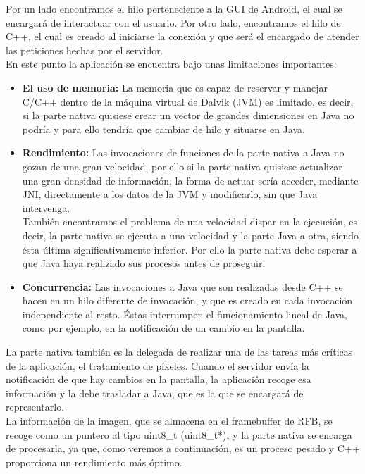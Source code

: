 Por un lado encontramos el hilo perteneciente a la GUI de Android, el cual se encargará de interactuar con el usuario. Por otro lado, encontramos el hilo de C++, el cual es creado al iniciarse la conexión y que será el encargado de atender las peticiones hechas por el servidor.\\

En este punto la aplicación se encuentra bajo unas limitaciones importantes:
\begin{itemize}
\item \textbf{El uso de memoria:} La memoria que es capaz de reservar y manejar C/C++ dentro de la máquina virtual de Dalvik (JVM) es limitado, es decir, si la parte nativa quisiese crear un vector de grandes dimensiones en Java no podría y para ello tendría que cambiar de hilo y situarse en Java.
\item \textbf{Rendimiento:} Las invocaciones de funciones de la parte nativa a Java no gozan de una gran velocidad, por ello si la parte nativa quisiese actualizar una gran densidad de información, la forma de actuar sería acceder, mediante JNI, directamente a los datos de la JVM y modificarlo, sin que Java intervenga.\\

También encontramos el problema de una velocidad dispar en la ejecución, es decir, la parte nativa se ejecuta a una velocidad y la parte Java a otra, siendo ésta última significativamente inferior. Por ello la parte nativa debe esperar a que Java haya realizado sus procesos antes de proseguir.

\item \textbf{Concurrencia:} Las invocaciones a Java que son realizadas desde C++ se hacen en un hilo diferente de invocación, y que es creado en cada invocación independiente al resto. Éstas interrumpen el funcionamiento lineal de Java, como por ejemplo, en la notificación de un cambio en la pantalla.

\end{itemize}

La parte nativa también es la delegada de realizar una de las tareas más críticas de la aplicación, el tratamiento de píxeles. Cuando el servidor envía la notificación de que hay cambios en la pantalla, la aplicación recoge esa información y la debe trasladar a Java, que es la que se encargará de representarlo.\\

La información de la imagen, que se almacena en el framebuffer de RFB, se recoge como un puntero al tipo uint8\_t (uint8\_t*), y la parte nativa se encarga de procesarla, ya que, como veremos a continuación, es un proceso pesado y C++ proporciona un rendimiento más óptimo.\\

